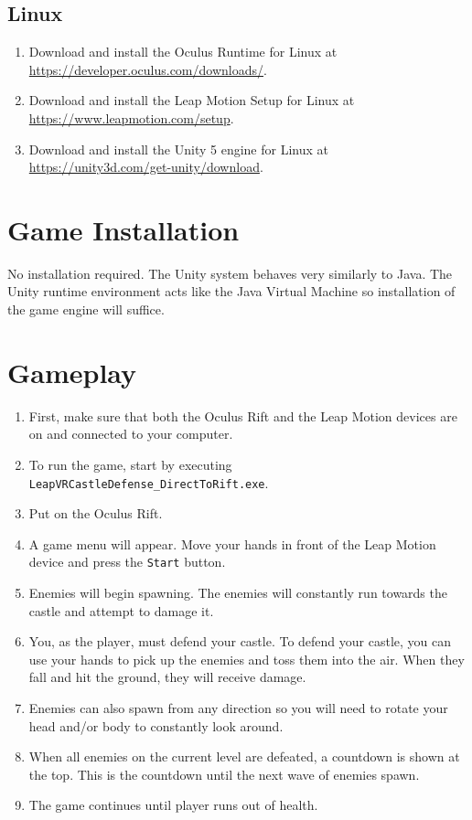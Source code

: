 \documentclass[a4paper]{refart}
\begin{document}
\subsection{Linux}

\begin{enumerate}
	\item Download and install the Oculus Runtime for Linux at\\ \url{https://developer.oculus.com/downloads/}.
	\item Download and install the Leap Motion Setup for Linux at\\ \url{https://www.leapmotion.com/setup}.
	\item Download and install the Unity 5 engine for Linux at\\ \url{https://unity3d.com/get-unity/download}.
\end{enumerate}

\pagebreak

\section{Game Installation}

No installation required. The Unity system behaves very similarly to Java. The Unity runtime environment acts like the Java Virtual Machine so installation of the game engine will suffice.

\section{Gameplay}

\begin{enumerate}
	\item First, make sure that both the Oculus Rift and the Leap Motion devices are on and connected to your computer.
	\item To run the game, start by executing \texttt{LeapVRCastleDefense\_DirectToRift.exe}.
	\item Put on the Oculus Rift.
	\item A game menu will appear. Move your hands in front of the Leap Motion device and press the \texttt{Start} button.
	\item Enemies will begin spawning. The enemies will constantly run towards the castle and attempt to damage it. 
	\item You, as the player, must defend your castle. To defend your castle, you can use your hands to pick up the enemies and toss them into the air. When they fall and hit the ground, they will receive damage. 
	\item Enemies can also spawn from any direction so you will need to rotate your head and/or body to constantly look around.
	\item When all enemies on the current level are defeated, a countdown is shown at the top. This is the countdown until the next wave of enemies spawn. 
	\item The game continues until player runs out of health.
\end{enumerate}
\end{document}
